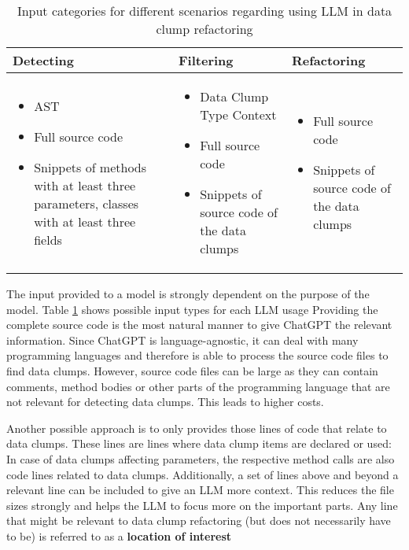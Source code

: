\begin{table}[]
    \centering
    \begin{tabular} {m{4cm} | m{4cm} | m{4cm}}
        Detecting & Filtering & Refactoring  \\\hline
         \begin{itemize}
             \item AST
             \item Full source code 
             \item Snippets of methods with at least three parameters, classes with at least three fields
         \end{itemize} & \begin{itemize}
             \item Data Clump Type Context
             \item Full source code
             \item Snippets of source code of the data clumps
         \end{itemize} & \begin{itemize}
             \item Full source code 
             \item Snippets of source code of the data clumps
         \end{itemize}
    \end{tabular}
    \caption{Input categories for different scenarios regarding using \ac{LLM} in data clump refactoring}
    \label{tab:data_clump_llm_input}
\end{table}

The input provided to a model is strongly dependent on the purpose of the model. Table \ref{tab:data_clump_llm_input} shows possible input types for each \ac{LLM} usage
Providing the complete source code is the most natural manner to give ChatGPT the relevant information. Since ChatGPT is language-agnostic, it can deal with many programming languages and therefore is able to process the source code files to find data clumps. However, source code files can be large as they can contain comments, method bodies or other parts of the programming language that are not relevant for detecting data clumps. This leads to higher costs.

Another possible approach is to only provides those lines of code that relate to data clumps. These lines are lines where data clump items are declared or used: In case of data clumps affecting parameters, the respective method calls are also code lines related to data clumps. Additionally, a set of lines above and beyond a relevant line can be included to give an \ac{LLM} more context. This reduces the file sizes strongly and helps the \ac{LLM} to focus more on the important parts. Any line that might be relevant to data clump refactoring (but does not necessarily have to be) is referred to as a \textbf{location of interest}

